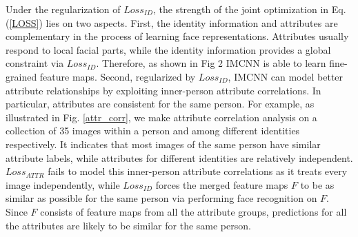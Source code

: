 \documentclass[wcp]{jmlr}
\begin{document}
	Under the regularization of $Loss_{ID}$, the strength of the joint optimization in Eq.(\ref{LOSS}) lies on two aspects. First, the identity information and attributes are complementary in the process of learning face representations. Attributes usually respond to local facial parts, while the identity information provides a global constraint via $Loss_{ID}$. Therefore, as shown in Fig 2 IMCNN is able to learn fine-grained feature maps. Second, regularized by $Loss_{ID}$, IMCNN can model better attribute relationships by exploiting inner-person attribute correlations. In particular, attributes are consistent for the same person. For example, as illustrated in Fig. \ref{attr_corr}, we make attribute correlation analysis on a collection of 35 images within a person and among different identities respectively. It indicates that most images of the same person have similar attribute labels, while attributes for different identities are relatively independent. $Loss_{ATTR}$ fails to model this inner-person attribute correlations as it treats every image independently, while $Loss_{ID}$ forces the merged feature maps $F$ to be as similar as possible for the same person via performing face recognition on $F$. Since $F$ consists of feature maps from all the attribute groups, predictions for all the attributes are likely to be similar for the same person.
\end{document}
